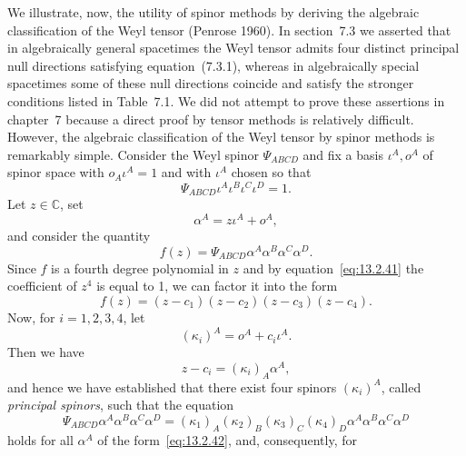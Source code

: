 We illustrate, now, the utility of spinor methods by deriving the algebraic
classification of the Weyl tensor (Penrose 1960). In section~7.3 we asserted that in
algebraically general spacetimes the Weyl tensor admits four distinct principal null
directions satisfying equation~(7.3.1), whereas in algebraically special spacetimes
some of these null directions coincide and satisfy the stronger conditions listed in
Table~7.1. We did not attempt to prove these assertions in chapter~7 because a
direct proof by tensor methods is relatively difficult. However, the algebraic
classification of the Weyl tensor by spinor methods is remarkably simple. Consider
the Weyl spinor \(\Psi_{ABCD}\) and fix a basis \(\iota^A,o^A\) of spinor space with
\(o_A\iota^A=1\) and with \(\iota^A\) chosen so that
\begin{equation}
  \Psi_{ABCD}\iota^A\iota^B\iota^C\iota^D=1.
  \tag{13.2.41}\label{eq:13.2.41}
\end{equation}
Let \(z\in\mathbb C\), set
\begin{equation}
  \alpha^A=z\iota^A+o^A,
  \tag{13.2.42}\label{eq:13.2.42}
\end{equation}
and consider the quantity
\begin{equation}
  f(z)=\Psi_{ABCD}\alpha^A\alpha^B\alpha^C\alpha^D.
  \tag{13.2.43}\label{eq:13.2.43}
\end{equation}
Since \(f\) is a fourth degree polynomial in \(z\) and by
equation~\eqref{eq:13.2.41} the coefficient of \(z^4\) is equal to 1, we can factor
it into the form
\begin{equation}
  f(z)=(z-c_1)(z-c_2)(z-c_3)(z-c_4).
  \tag{13.2.44}\label{eq:13.2.44}
\end{equation}
Now, for \(i=1,2,3,4\), let
\begin{equation}
  (\kappa_i)^A=o^A+c_i\iota^A.
  \tag{13.2.45}\label{eq:13.2.45}
\end{equation}
Then we have
\begin{equation}
  z-c_i=(\kappa_i)_A\alpha^A,
  \tag{13.2.46}\label{eq:13.2.46}
\end{equation}
and hence we have established that there exist four spinors \((\kappa_i)^A\), called
\emph{principal spinors}, such that the equation
\begin{equation}
  \Psi_{ABCD}\alpha^A\alpha^B\alpha^C\alpha^D
  =(\kappa_1)_A(\kappa_2)_B(\kappa_3)_C(\kappa_4)_D
    \alpha^A\alpha^B\alpha^C\alpha^D
  \tag{13.2.47}\label{eq:13.2.47}
\end{equation}
holds for all \(\alpha^A\) of the form~\eqref{eq:13.2.42}, and, consequently, for
